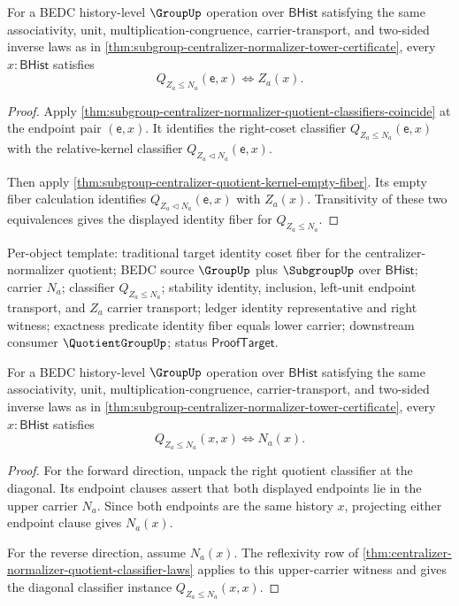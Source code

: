 \begin{theorem}
\label{thm:subgroup-centralizer-normalizer-coset-classifier-identity-fiber}
For a BEDC history-level $\GroupUp$ operation over $\mathsf{BHist}$
satisfying the same associativity, unit, multiplication-congruence,
carrier-transport, and two-sided inverse laws as in
\autoref{thm:subgroup-centralizer-normalizer-tower-certificate}, every
$x:\mathsf{BHist}$ satisfies
$$
Q_{Z_a\leq N_a}(\mathsf{e},x)\Longleftrightarrow Z_a(x).
$$
\end{theorem}
\begin{proof}
Apply
\autoref{thm:subgroup-centralizer-normalizer-quotient-classifiers-coincide} at
the endpoint pair $(\mathsf{e},x)$. It identifies the right-coset classifier
$Q_{Z_a\leq N_a}(\mathsf{e},x)$ with the relative-kernel classifier
$Q_{Z_a\triangleleft N_a}(\mathsf{e},x)$.

Then apply
\autoref{thm:subgroup-centralizer-quotient-kernel-empty-fiber}. Its empty
fiber calculation identifies
$Q_{Z_a\triangleleft N_a}(\mathsf{e},x)$ with $Z_a(x)$. Transitivity of these
two equivalences gives the displayed identity fiber for
$Q_{Z_a\leq N_a}$.
\end{proof}

Per-object template: traditional target identity coset fiber for the
centralizer-normalizer quotient; BEDC source $\GroupUp$ plus $\SubgroupUp$
over $\mathsf{BHist}$; carrier $N_a$; classifier $Q_{Z_a\leq N_a}$; stability
identity, inclusion, left-unit endpoint transport, and $Z_a$ carrier transport;
ledger identity representative and right witness; exactness predicate identity
fiber equals lower carrier; downstream consumer $\QuotientGroupUp$; status
$\mathsf{ProofTarget}$.

\begin{theorem}
\label{thm:subgroup-centralizer-right-quotient-diagonal-carrier-exactness}
For a BEDC history-level $\GroupUp$ operation over $\mathsf{BHist}$
satisfying the same associativity, unit, multiplication-congruence,
carrier-transport, and two-sided inverse laws as in
\autoref{thm:subgroup-centralizer-normalizer-tower-certificate}, every
$x:\mathsf{BHist}$ satisfies
$$
Q_{Z_a\leq N_a}(x,x)\Longleftrightarrow N_a(x).
$$
\end{theorem}
\begin{proof}
For the forward direction, unpack the right quotient classifier at the diagonal.
Its endpoint clauses assert that both displayed endpoints lie in the upper
carrier $N_a$. Since both endpoints are the same history $x$, projecting either
endpoint clause gives $N_a(x)$.

For the reverse direction, assume $N_a(x)$. The reflexivity row of
\autoref{thm:centralizer-normalizer-quotient-classifier-laws} applies to this
upper-carrier witness and gives the diagonal classifier instance
$Q_{Z_a\leq N_a}(x,x)$.
\end{proof}

